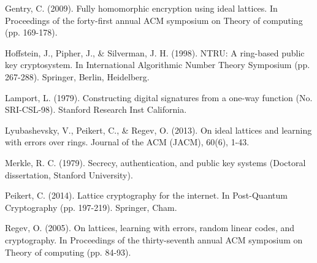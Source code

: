 \documentclass[11pt]{article}
\begin{document}
Gentry, C. (2009). Fully homomorphic encryption using ideal lattices. In Proceedings of the forty-first annual ACM symposium on Theory of computing (pp. 169-178).


Hoffstein, J., Pipher, J., \& Silverman, J. H. (1998). NTRU: A ring-based public key cryptosystem. In International Algorithmic Number Theory Symposium (pp. 267-288). Springer, Berlin, Heidelberg.


Lamport, L. (1979). Constructing digital signatures from a one-way function (No. SRI-CSL-98). Stanford Research Inst California.


Lyubashevsky, V., Peikert, C., \& Regev, O. (2013). On ideal lattices and learning with errors over rings. Journal of the ACM (JACM), 60(6), 1-43.


Merkle, R. C. (1979). Secrecy, authentication, and public key systems (Doctoral dissertation, Stanford University).


Peikert, C. (2014). Lattice cryptography for the internet. In Post-Quantum Cryptography (pp. 197-219). Springer, Cham.


Regev, O. (2005). On lattices, learning with errors, random linear codes, and cryptography. In Proceedings of the thirty-seventh annual ACM symposium on Theory of computing (pp. 84-93).
\end{document}

